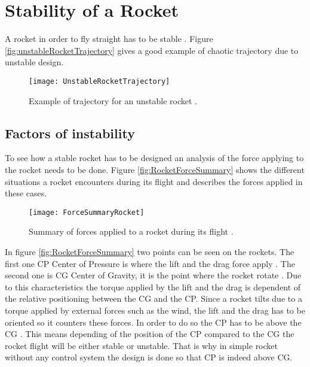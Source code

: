 \section{Stability of a Rocket}
\graphicspath{{figures/"Preanalysis&Requirement"/RocketStability/}}
A rocket in order to fly straight has to be stable \cite{web:rocketnasa}. Figure \vref{fig:unstableRocketTrajectory} gives a good example of chaotic trajectory due to unstable design.

\begin{figure} [htbp]
	\centering
	\texttt{[image: UnstableRocketTrajectory]}
	\caption{Example of trajectory for an unstable rocket \cite{web:rocketnasa}.}
	\label{fig:unstableRocketTrajectory}
\end{figure}

\subsection{Factors of instability}
To see how a stable rocket has to be designed an analysis of the force applying to the rocket needs to be done. Figure \vref{fig:RocketForceSummary} shows the different situations a rocket encounters during its flight and describes the forces applied in these cases.

\begin{figure}[htbp]
	\centering
	\texttt{[image: ForceSummaryRocket]}
	\caption{Summary of forces applied to a rocket during its flight \cite{web:rocketnasa}.}
	\label{fig:RocketForceSummary}
\end{figure}

In figure \vref{fig:RocketForceSummary} two points can be seen on the rockets. The first one CP Center of Pressure is where the  lift and the drag force apply \cite{web:rocketnasa}. The second one is CG Center of Gravity, it is the point where the rocket rotate \cite{web:rocketnasa}. Due to this characteristics the torque applied by the lift and the drag is dependent of the relative positioning between the CG and the CP. Since a rocket tilts due to a torque applied by external forces such as the wind, the lift and the drag has to be oriented so it counters these forces. In order to do so the CP has to be above the CG \cite{web:rocketnasa}.
This means depending of the position of the CP compared to the CG the rocket flight will be either stable or unstable. That is why in simple rocket without any control system the design is done so that CP is indeed above CG.

